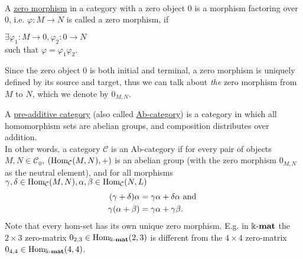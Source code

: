 \begin{definition}\label{def:zero_morphism}\phantom{}\\
A \ul{zero morphism} in a category with a zero object $0$ is a morphism factoring over $0$, i.e. $\varphi : M \rightarrow N$ is called a zero
morphism, if\\
\begin{minipage}{.35\textwidth}
\end{minipage}
\begin{minipage}{.65\textwidth}
$\exists \varphi_{1} : M \rightarrow 0, \varphi_{2} : 0 \rightarrow N$\\
such that $\varphi = \varphi_{1}\varphi_{2}$.
\end{minipage}
Since the zero object $0$ is both initial and terminal, a zero morphism is uniquely defined by its source and target, thus we can
talk about \textit{the} zero morphism from $M$ to $N$, which we denote by $0_{M,N}$.
\end{definition}

\begin{definition}
A \ul{pre-additive category} (also called  \ul{Ab-category}) is a category in which all homomorphism sets are abelian groups,
and composition distributes over addition.\\
In other words, a category $\mathcal{C}$ is an Ab-category if for every pair of objects $M,N \in \mathcal{C}_{0}$,
$( \textup{Hom}_{\mathcal{C}}(M,N), + )$ is an abelian group (with the zero morphism $0_{M,N}$ as the neutral element),
and for all morphisms $\gamma, \delta \in \textup{Hom}_{\mathcal{C}}(M,N),
\alpha, \beta \in \textup{Hom}_{\mathcal{C}}(N,L)$
\begin{align}
(\gamma + \delta)\alpha &=\label{eq:dist1} \gamma\alpha + \delta\alpha \textup{ and }\\
\gamma(\alpha+\beta) &=\label{eq:dist2} \gamma\alpha + \gamma\beta.
\end{align}
Note that every hom-set has its own unique zero morphism. E.g. in $\Bbbk\textnormal{-}\mathbf{mat}$ the $2 \times 3$ zero-matrix
$0_{2,3} \in \textup{Hom}_{\Bbbk\textnormal{-}\mathbf{mat}}(2,3)$ is different from the $4 \times 4$ zero-matrix $0_{4,4} \in \textup{Hom}_{\Bbbk\textnormal{-}\mathbf{mat}}(4,4)$.
\end{definition}

